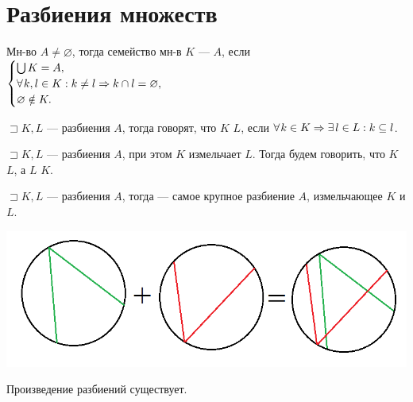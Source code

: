 \section{Разбиения множеств}\label{sec:ch-1-sec-2}

\begin{definition}[Разбиение мн-в]
    Мн-во $A \neq \varnothing$, тогда семейство мн-в $K$ ---  $A$, если
    $\begin{cases}
         \bigcup K = A,\\
         \forall k, l \in K : k \neq l \imp k \cap l = \varnothing,\\
         \varnothing \notin K.
    \end{cases}$
\end{definition}

\begin{definition}
    $\sqsupset K, L$ --- разбиения $A$, тогда говорят, что $K$  $L$, если $\forall k \in K \imp \exists l \in L : k \subseteq l$.
\end{definition}

\begin{sh-remark}
    $\sqsupset K, L$ --- разбиения $A$, при этом $K$ измельчает $L$.
    Тогда будем говорить, что $K$  $L$, а $L$  $K$.
\end{sh-remark}

\begin{definition}
    $\sqsupset K, L$ --- разбиения $A$, тогда  --- самое крупное разбиение $A$, измельчающее $K$ и $L$.

    \begin{center}
        \includegraphics[scale=0.4]{res/произведение разбиений}
    \end{center}
\end{definition}

\begin{sh-proposition}
    Произведение разбиений существует.
\end{sh-proposition}

